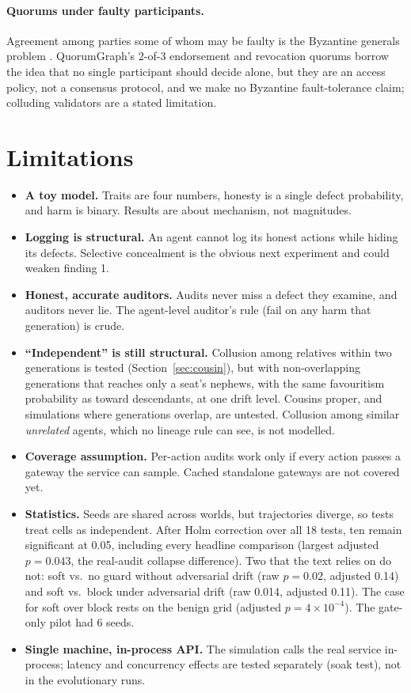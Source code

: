 \documentclass[11pt]{article}
\begin{document}
\paragraph{Quorums under faulty participants.} Agreement among parties some of whom may be
faulty is the Byzantine generals problem \citep{lamport1982byzantine}. QuorumGraph's 2-of-3
endorsement and revocation quorums borrow the idea that no single participant should decide
alone, but they are an access policy, not a consensus protocol, and we make no Byzantine
fault-tolerance claim; colluding validators are a stated limitation.

\section{Limitations}
\label{sec:limits}

\begin{itemize}
  \item \textbf{A toy model.} Traits are four numbers, honesty is a single defect probability,
  and harm is binary. Results are about mechanism, not magnitudes.
  \item \textbf{Logging is structural.} An agent cannot log its honest actions while hiding
  its defects. Selective concealment is the obvious next experiment and could weaken
  finding 1.
  \item \textbf{Honest, accurate auditors.} Audits never miss a defect they examine, and
  auditors never lie. The agent-level auditor's rule (fail on any harm that generation) is
  crude.
  \item \textbf{``Independent'' is still structural.} Collusion among relatives within two
  generations is tested (Section~\ref{sec:cousin}), but with non-overlapping generations
  that reaches only a seat's nephews, with the same favouritism probability as toward
  descendants, at one drift level. Cousins proper, and simulations where generations
  overlap, are untested. Collusion among similar
  \emph{unrelated} agents, which no lineage rule can see, is not modelled.
  \item \textbf{Coverage assumption.} Per-action audits work only if every action passes a
  gateway the service can sample. Cached standalone gateways are not covered yet.
  \item \textbf{Statistics.} Seeds are shared across worlds, but trajectories diverge, so
  tests treat cells as independent. After Holm correction over all 18 tests, ten remain
  significant at 0.05, including every headline comparison (largest adjusted $p = 0.043$, the
  real-audit collapse difference). Two that the text relies on do not: soft vs.\ no guard
  without adversarial drift (raw $p = 0.02$, adjusted 0.14) and soft vs.\ block under
  adversarial drift (raw 0.014, adjusted 0.11). The case for soft over block rests on the
  benign grid (adjusted $p = 4\times10^{-4}$). The gate-only pilot had 6 seeds.
  \item \textbf{Single machine, in-process API.} The simulation calls the real service
  in-process; latency and concurrency effects are tested separately (soak test), not in the
  evolutionary runs.
\end{itemize}
\end{document}
